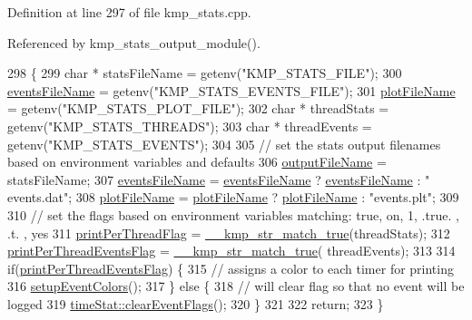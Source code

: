 Definition at line 297 of file kmp\-\_\-stats.\-cpp.



Referenced by kmp\-\_\-stats\-\_\-output\-\_\-module().


\begin{DoxyCode}
298 \{
299     \textcolor{keywordtype}{char} * statsFileName  = getenv(\textcolor{stringliteral}{"KMP\_STATS\_FILE"});
300     \hyperlink{classkmp__stats__output__module_abeb05f889265a698f6d82f1a66f0ea6d}{eventsFileName}        = getenv(\textcolor{stringliteral}{"KMP\_STATS\_EVENTS\_FILE"});
301     \hyperlink{classkmp__stats__output__module_ab28d6e78e962dd887f82a6733d82b0ab}{plotFileName}          = getenv(\textcolor{stringliteral}{"KMP\_STATS\_PLOT\_FILE"});
302     \textcolor{keywordtype}{char} * threadStats    = getenv(\textcolor{stringliteral}{"KMP\_STATS\_THREADS"});
303     \textcolor{keywordtype}{char} * threadEvents   = getenv(\textcolor{stringliteral}{"KMP\_STATS\_EVENTS"});
304 
305     \textcolor{comment}{// set the stats output filenames based on environment variables and defaults}
306     \hyperlink{classkmp__stats__output__module_a6df3664723fafa911c12fb75870a98ae}{outputFileName} = statsFileName;
307     \hyperlink{classkmp__stats__output__module_abeb05f889265a698f6d82f1a66f0ea6d}{eventsFileName} = \hyperlink{classkmp__stats__output__module_abeb05f889265a698f6d82f1a66f0ea6d}{eventsFileName} ? \hyperlink{classkmp__stats__output__module_abeb05f889265a698f6d82f1a66f0ea6d}{eventsFileName} : \textcolor{stringliteral}{"
      events.dat"};
308     \hyperlink{classkmp__stats__output__module_ab28d6e78e962dd887f82a6733d82b0ab}{plotFileName}   = \hyperlink{classkmp__stats__output__module_ab28d6e78e962dd887f82a6733d82b0ab}{plotFileName}   ? \hyperlink{classkmp__stats__output__module_ab28d6e78e962dd887f82a6733d82b0ab}{plotFileName}   : \textcolor{stringliteral}{"events.plt"};
309 
310     \textcolor{comment}{// set the flags based on environment variables matching: true, on, 1, .true. , .t. , yes}
311     \hyperlink{classkmp__stats__output__module_adfe5f484599e868c3695086fa3618640}{printPerThreadFlag}        = \hyperlink{kmp__str_8c_a8cd4e13706553ea42292e282a0ced826}{\_\_kmp\_str\_match\_true}(threadStats);
312     \hyperlink{classkmp__stats__output__module_abfc8ceea0aeda3190a597aa12b1594e8}{printPerThreadEventsFlag}  = \hyperlink{kmp__str_8c_a8cd4e13706553ea42292e282a0ced826}{\_\_kmp\_str\_match\_true}(
      threadEvents);
313 
314     \textcolor{keywordflow}{if}(\hyperlink{classkmp__stats__output__module_abfc8ceea0aeda3190a597aa12b1594e8}{printPerThreadEventsFlag}) \{
315         \textcolor{comment}{// assigns a color to each timer for printing}
316         \hyperlink{classkmp__stats__output__module_a380fd50943ea69ad95fc791620f174a1}{setupEventColors}();
317     \} \textcolor{keywordflow}{else} \{
318         \textcolor{comment}{// will clear flag so that no event will be logged}
319         \hyperlink{classtimeStat_a1ee4b834f58f4f104d3c1e0a3f253e9a}{timeStat::clearEventFlags}();
320     \}
321 
322     \textcolor{keywordflow}{return};
323 \}
\end{DoxyCode}
